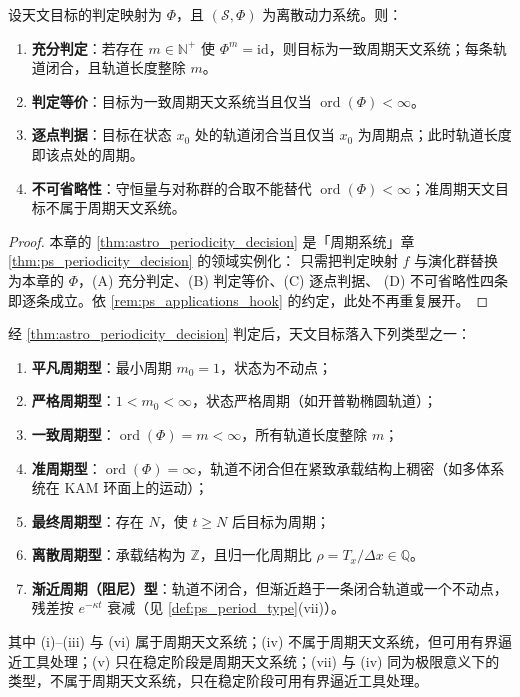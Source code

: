 \begin{theorem}[天文周期性判定定理]\label{thm:astro_periodicity_decision}
设天文目标的判定映射为 \(\Phi\)，且 \((\mathcal S,\Phi)\) 为离散动力系统。则：
\begin{enumerate}[label=(\Alph*)]
    \item \textbf{充分判定}：若存在 \(m\in\mathbb N^+\) 使 \(\Phi^m=\mathrm{id}\)，则目标为一致周期天文系统；每条轨道闭合，且轨道长度整除 \(m\)。
    \item \textbf{判定等价}：目标为一致周期天文系统当且仅当 \(\operatorname{ord}(\Phi)<\infty\)。
    \item \textbf{逐点判据}：目标在状态 \(x_0\) 处的轨道闭合当且仅当 \(x_0\) 为周期点；此时轨道长度即该点处的周期。
    \item \textbf{不可省略性}：守恒量与对称群的合取不能替代 \(\operatorname{ord}(\Phi)<\infty\)；准周期天文目标不属于周期天文系统。
\end{enumerate}
\end{theorem}

\begin{proof}
本章的 \cref{thm:astro_periodicity_decision} 是「周期系统」章 \cref{thm:ps_periodicity_decision} 的领域实例化：
只需把判定映射 $f$ 与演化群替换为本章的 $\Phi$，(A) 充分判定、(B) 判定等价、(C) 逐点判据、
(D) 不可省略性四条即逐条成立。依 \cref{rem:ps_applications_hook} 的约定，此处不再重复展开。
\end{proof}

\begin{corollary}[天文周期类型]\label{cor:astro_period_type}
经 \cref{thm:astro_periodicity_decision} 判定后，天文目标落入下列类型之一：
\begin{enumerate}[label=(\roman*)]
    \item \textbf{平凡周期型}：最小周期 \(m_0=1\)，状态为不动点；
    \item \textbf{严格周期型}：\(1<m_0<\infty\)，状态严格周期（如开普勒椭圆轨道）；
    \item \textbf{一致周期型}：\(\operatorname{ord}(\Phi)=m<\infty\)，所有轨道长度整除 \(m\)；
    \item \textbf{准周期型}：\(\operatorname{ord}(\Phi)=\infty\)，轨道不闭合但在紧致承载结构上稠密（如多体系统在 KAM 环面上的运动）；
    \item \textbf{最终周期型}：存在 \(N\)，使 \(t\ge N\) 后目标为周期；
    \item \textbf{离散周期型}：承载结构为 \(\mathbb Z\)，且归一化周期比 \(\rho=T_x/\Delta x\in\mathbb Q\)。
    \item \textbf{渐近周期（阻尼）型}：轨道不闭合，但渐近趋于一条闭合轨道或一个不动点，残差按 \(e^{-\kappa t}\) 衰减（见 \cref{def:ps_period_type}(vii)）。
\end{enumerate}
其中 (i)--(iii) 与 (vi) 属于周期天文系统；(iv) 不属于周期天文系统，但可用有界逼近工具处理；(v) 只在稳定阶段是周期天文系统；(vii) 与 (iv) 同为极限意义下的类型，不属于周期天文系统，只在稳定阶段可用有界逼近工具处理。
\end{corollary}

